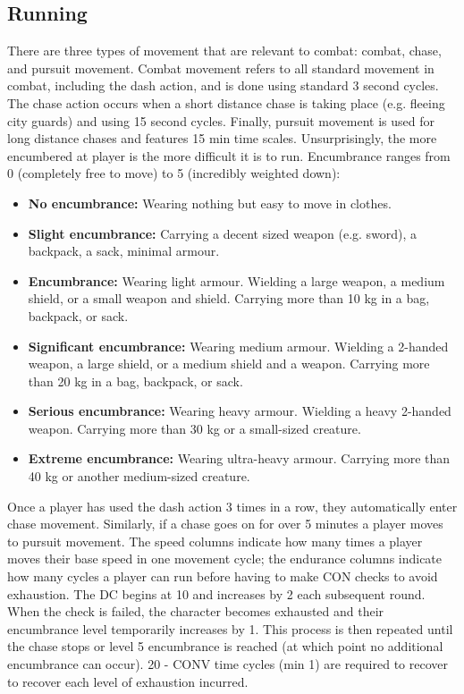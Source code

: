 \documentclass[letterpaper,12pt]{article}
\begin{document}
\subsection{Running}

 There are three types of movement that are relevant to combat: combat, chase, and pursuit movement. Combat movement refers to all standard movement in combat, including the dash action, and is done using standard 3 second cycles. The chase action occurs when a short distance chase is taking place (e.g. fleeing city guards) and using 15 second cycles. Finally, pursuit movement is used for long distance chases and features 15 min time scales. Unsurprisingly, the more encumbered at player is the more difficult it is to run. Encumbrance ranges from 0 (completely free to move) to 5 (incredibly weighted down):
 
\begin{itemize}
\item \textbf{No encumbrance:} Wearing nothing but easy to move in clothes.
\item \textbf{Slight encumbrance:} Carrying a decent sized weapon (e.g. sword), a backpack, a sack, minimal armour.
\item \textbf{Encumbrance:} Wearing light armour. Wielding a large weapon, a medium shield, or a small weapon and shield. Carrying more than 10 kg in a bag, backpack, or sack. 
\item \textbf{Significant encumbrance:} Wearing medium armour. Wielding a 2-handed weapon, a large shield, or a medium shield and a weapon. Carrying more than 20 kg in a bag, backpack, or sack.
\item \textbf{Serious encumbrance:} Wearing heavy armour. Wielding a heavy 2-handed weapon. Carrying more than 30 kg or a small-sized creature.
\item \textbf{Extreme encumbrance:} Wearing ultra-heavy armour. Carrying more than 40 kg or another medium-sized creature.
\end{itemize}
 
Once a player has used the dash action 3 times in a row, they automatically enter chase movement. Similarly, if a chase goes on for over 5 minutes a player moves to pursuit movement. The speed columns indicate how many times a player moves their base speed in one movement cycle; the endurance columns indicate how many cycles a player can run before having to make CON checks to avoid exhaustion. The DC begins at 10 and increases by 2 each subsequent round. When the check is failed, the character becomes exhausted and their encumbrance level temporarily increases by 1. This process is then repeated until the chase stops or level 5 encumbrance is reached (at which point no additional encumbrance can occur). 20 - CONV time cycles (min 1) are required to recover to recover each level of exhaustion incurred.   
 
\end{document}
